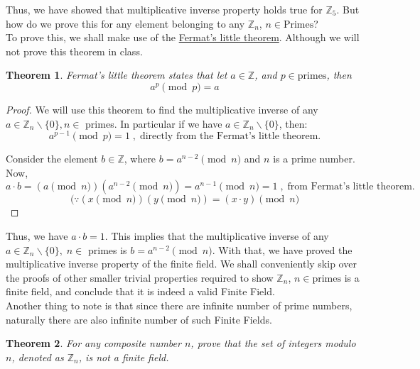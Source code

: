 \documentclass[11pt]{article}
\theoremstyle{definition}
\theoremstyle{plain}
\newtheorem{theorem}{Theorem}
\begin{document}
Thus, we have showed that multiplicative inverse property holds true for $\mathbb{Z}_{5}$. But how do we prove this for any element belonging to any $\mathbb{Z}_{n}$, $n \in \text{Primes}$?\\

To prove this, we shall make use of the \href{https://en.wikipedia.org/wiki/Fermat%27s_little_theorem}{Fermat's little theorem}. Although we will not prove this theorem in class.\\

\begin{theorem}
    Fermat's little theorem states that let $a \in \mathbb{Z}$, and $p \in \text{primes}$, then $$a^{p} \pmod{p} = a$$
\end{theorem}


\begin{proof}
We will use this theorem to find the multiplicative inverse of any $a \in \mathbb{Z}_{n} \backslash \{0\}, n \in$ primes. In particular if we have $a \in \mathbb{Z}_{n} \backslash \{0\}$, then: $$\boxed{a^{p-1} \pmod{p} = 1} \; , \; \text{directly from the Fermat's little theorem.}$$ 

Consider the element $b \in \mathbb{Z}$, where $b = a^{n-2} \pmod{n}$ and $n$ is a prime number. Now, $$\boxed{a \cdot b = (a \pmod{n})(a^{n-2} \pmod{n}) = a^{n-1} \pmod{n} = 1} \; , \; \text{from Fermat's little theorem.}$$
$$(\because (x \pmod{n})(y \pmod{n}) = (x \cdot y) \pmod{n}$$
\end{proof}

Thus, we have $a \cdot b = 1$. This implies that the multiplicative inverse of any $a \in \mathbb{Z}_{n} \backslash \{0\}, \; n \in$ primes is $b = a^{n-2} \pmod{n}$. With that, we have proved the multiplicative inverse property of the finite field. We shall conveniently skip over the proofs of other smaller trivial properties required to show $\mathbb{Z}_{n}$, $n \in \text{primes}$ is a finite field, and conclude that it is indeed a valid Finite Field.\\

Another thing to note is that since there are infinite number of prime numbers, naturally there are also infinite number of such Finite Fields.


\begin{theorem}
 For any composite number \( n \), prove that the set of integers modulo \( n \), denoted as \( \mathbb{Z}_n \), is not a finite field.
\end{theorem}
\end{document}
